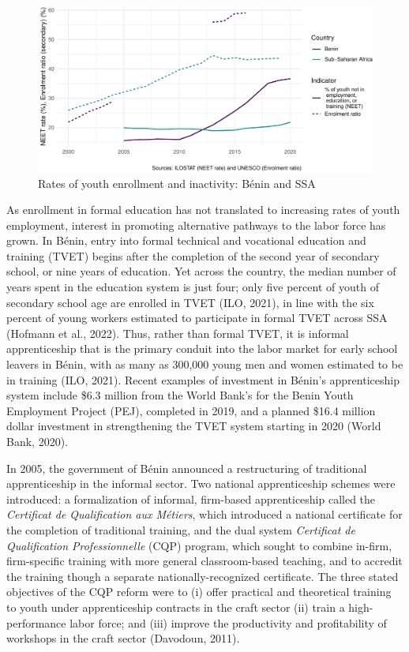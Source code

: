 \documentclass[
  11pt,
a4paper
]{article}
\begin{document}
\begin{figure}[H]
\includegraphics{figures/fig-enrollment-1} \caption{Rates of youth enrollment and inactivity: Bénin and SSA}\label{fig:fig-enrollment}
\end{figure}

As enrollment in formal education has not translated to increasing rates of youth employment, interest in promoting alternative pathways to the labor force has grown. In Bénin, entry into formal technical and vocational education and training (TVET) begins after the completion of the second year of secondary school, or nine years of education. Yet across the country, the median number of years spent in the education system is just four; only five percent of youth of secondary school age are enrolled in TVET (ILO, 2021), in line with the six percent of young workers estimated to participate in formal TVET across SSA (Hofmann et al., 2022). Thus, rather than formal TVET, it is informal apprenticeship that is the primary conduit into the labor market for early school leavers in Bénin, with as many as 300,000 young men and women estimated to be in training (ILO, 2021). Recent examples of investment in Bénin's apprenticeship system include \$6.3 million from the World Bank's for the Benin Youth Employment Project (PEJ), completed in 2019, and a planned \$16.4 million dollar investment in strengthening the TVET system starting in 2020 (World Bank, 2020).

In 2005, the government of Bénin announced a restructuring of traditional apprenticeship in the informal sector. Two national apprenticeship schemes were introduced: a formalization of informal, firm-based apprenticeship called the \emph{Certificat de Qualification aux Métiers}, which introduced a national certificate for the completion of traditional training, and the dual system \emph{Certificat de Qualification Professionnelle} (CQP) program, which sought to combine in-firm, firm-specific training with more general classroom-based teaching, and to accredit the training though a separate nationally-recognized certificate. The three stated objectives of the CQP reform were to (i) offer practical and theoretical training to youth under apprenticeship contracts in the craft sector (ii) train a high-performance labor force; and (iii) improve the productivity and profitability of workshops in the craft sector (Davodoun, 2011).
\end{document}

